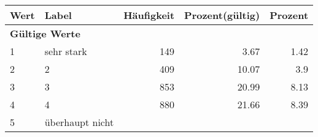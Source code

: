      \begin{longtable}{lXrrr}
     \toprule
     \textbf{Wert} & \textbf{Label} & \textbf{Häufigkeit} & \textbf{Prozent(gültig)} & \textbf{Prozent} \\
     \endhead
     \midrule
     \multicolumn{5}{l}{\textbf{Gültige Werte}}\\

     1 &
     \multicolumn{1}{X}{ sehr stark   } &


       \num{149} &
       \num[round-mode=places,round-precision=2]{3,67} &
         \num[round-mode=places,round-precision=2]{1,42} \\

     2 &
     \multicolumn{1}{X}{ 2   } &


       \num{409} &
       \num[round-mode=places,round-precision=2]{10,07} &
         \num[round-mode=places,round-precision=2]{3,9} \\

     3 &
     \multicolumn{1}{X}{ 3   } &


       \num{853} &
       \num[round-mode=places,round-precision=2]{20,99} &
         \num[round-mode=places,round-precision=2]{8,13} \\

     4 &
     \multicolumn{1}{X}{ 4   } &


       \num{880} &
       \num[round-mode=places,round-precision=2]{21,66} &
         \num[round-mode=places,round-precision=2]{8,39} \\

     5 &
     \multicolumn{1}{X}{ überhaupt nicht   } &



\end{longtable}
